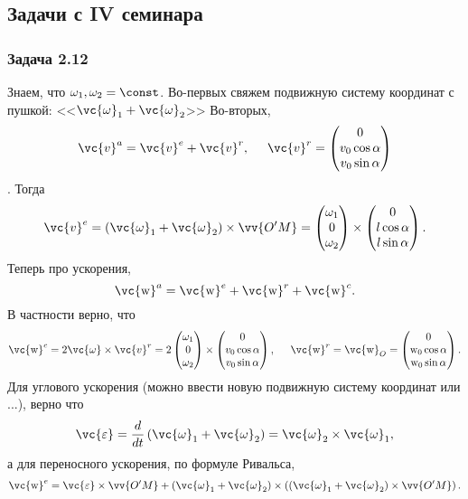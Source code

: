 \subsection{Задачи с IV семинара}
\subsubsection*{Задача 2.12}
Знаем, что $\omega_1, \omega_2 = \const$.
Во-первых свяжем подвижную систему координат с пушкой: <<$\vc{\omega}_1 + \vc{\omega}_2$>>
Во-вторых,
$$
    \vc{v}^a = \vc{v}^e + \vc{v}^r,
    \hspace{0.5cm} 
    \vc{v}^r = \begin{pmatrix}
        0 \\ v_0 \cos \alpha \\ v_0 \sin \alpha
    \end{pmatrix}
$$. 
Тогда
$$
    \vc{v}^e = (\vc{\omega}_1 + \vc{\omega}_2) \times \vv{O'M} = \begin{pmatrix}
        \omega_1 \\ 0 \\ \omega_2
    \end{pmatrix} \times
    \begin{pmatrix}
        0 \\ l \cos \alpha \\ l \sin \alpha
    \end{pmatrix}.
$$
Теперь про ускорения, 
$$
    \vc{\mathrm{w}}^a = \vc{\mathrm{w}}^e + \vc{\mathrm{w}}^r + \vc{\mathrm{w}}^c.
$$
В частности верно, что
$$
    \vc{\mathrm{w}}^c = 2 \vc{\omega} \times \vc{v}^r = 2 \begin{pmatrix}
        \omega_1 \\ 0 \\ \omega_2
    \end{pmatrix} \times
    \begin{pmatrix}
        0 \\ v_0 \cos \alpha \\ v_0 \sin \alpha
    \end{pmatrix},
    \hspace{0.5cm} 
    \vc{\mathrm{w}}^r = \vc{\mathrm{w}}_O = \begin{pmatrix}
        0 \\ \mathrm{w}_0 \cos \alpha \\ \mathrm{w}_0 \sin \alpha
    \end{pmatrix}.
$$
Для углового ускорения (можно ввести новую подвижную систему координат или ...), верно что
$$
    \vc{\varepsilon} = 
    \frac{d}{dt} \left(\vc{\omega}_1 + \vc{\omega}_2 \right) = \vc{\omega}_2 \times \vc{\omega}_1,
$$
а для переносного ускорения, по формуле Ривальса, 
$$
    \vc{\mathrm{w}}^e = \vc{\varepsilon} \times \vv{O'M} + (\vc{\omega}_1 + \vc{\omega}_2) \times \left(
        (\vc{\omega}_1 + \vc{\omega}_2) \times \vv{O'M}
    \right).
$$

